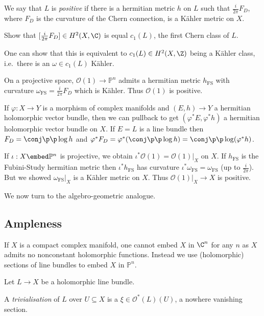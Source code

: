 \documentclass[a4paper]{article}
\renewcommand{\P}{\mathbb P} %
\begin{document}
\begin{definition}[positive]
  We say that \(L\) is \emph{positive} if there is a hermitian metric \(h\) on \(L\) such that \(\frac{i}{2\pi}F_D\), where \(F_D\) is the curvature of the Chern connection, is a Kähler metric on \(X\).
\end{definition}

\begin{ex}
  Show that \([\frac{i}{2\pi} F_D] \in H^2(X, \C)\) is equal \(c_1(L)\), the first Chern class of \(L\).
\end{ex}
One can show that this is equivalent to \(c_1(L) \in H^2(X, \Z)\) being a Kähler class, i.e.\ there is an \(\omega \in c_1(L)\) Kähler.

On a projective space, \(\mathcal O(1) \to \P^n\) admits a hermitian metric \(h_{\text{FS}}\) with curvature \(\omega_{\text{FS}} = \frac{i}{2\pi} F_D\) which is Kähler. Thus \(\mathcal O(1)\) is positive.

If \(\varphi: X \to Y\) is a morphism of complex manifolds and \((E, h) \to Y\) a hermitian holomorphic vector bundle, then we can pullback to get \((\varphi^*E, \varphi^*h)\) a hermitian holomorphic vector bundle on \(X\). If \(E = L\) is a line bundle then \(F_D = \conj \p \p \log h\) and \(\varphi^* F_D = \varphi^*(\conj \p \p \log h) = \conj \p \p \log (\varphi^*h)\).

If \(\iota: X \embed \P^n\) is projective, we obtain \(\iota^* \mathcal O(1) = \mathcal O(1)|_X\) on \(X\). If \(h_{\text{FS}}\) is the Fubini-Study hermitian metric then \(\iota^* h_{\text{FS}}\) has curvature \(\iota^* \omega_{\text{FS}} = \omega_{\text{FS}}\) (up to \(\frac{i}{2\pi}\)). But we showed \(\omega_{\text{FS}}|_X\) is a Kähler metric on \(X\). Thus \(\mathcal O(1)|_X \to X\) is positive.

We now turn to the algebro-geometric analogue.

\subsection{Ampleness}

If \(X\) is a compact complex manifold, one cannot embed \(X\) in \(\C^n\) for any \(n\) as \(X\) admits no nonconstant holomorphic functions. Instead we use (holomorphic) sections of line bundles to embed \(X\) in \(\P^n\).

Let \(L \to X\) be a holomorphic line bundle.
\begin{definition}[trivialisation]
  A \emph{trivialisation} of \(L\) over \(U \subseteq X\) is a \(\xi \in \mathcal O^*(L)(U)\), a nowhere vanishing section.
\end{definition}
\end{document}
